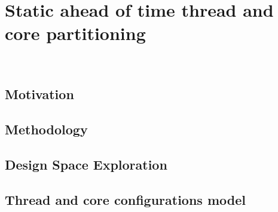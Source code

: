 %
%
%
%
%
%
%

\chapter{Static ahead of time thread and core partitioning}~\label{chp:streamit}

\label{sec:intro}


%

\section{Motivation}\label{sec:motiviation}


\section{Methodology}\label{chp:stream:sec:setup}


\section{Design Space Exploration}\label{sec:streamit:dse}


\section{Thread and core configurations model}\label{sec:ml}

\label{chp:streamit:sec:core}

